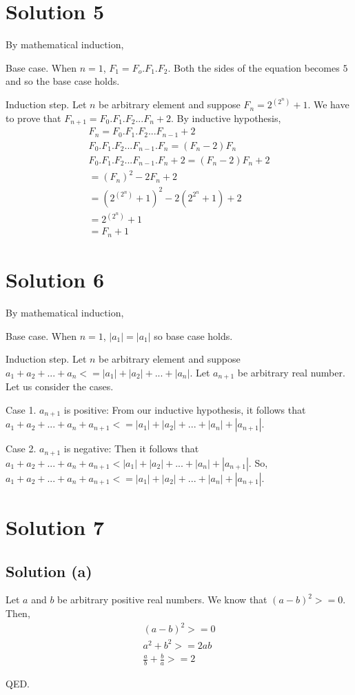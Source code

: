 \documentclass{article}
\begin{document}
\section{Solution 5}
By mathematical induction,

Base case. When $n=1$, $F_1 = F_o.F_1.F_2$. Both the sides of the
equation becomes $5$ and so the base case holds.

Induction step. Let $n$ be arbitrary element and suppose $F_n =
2^{(2^n)} + 1$. We have to prove that $F_{n+1} = F_0.F_1.F_2 ... F_n +
2$. By inductive hypothesis,
\begin{align*}
  F_n = F_0.F_1.F_2 ... F_{n-1} + 2 \\
  F_0.F_1.F_2 ... F_{n-1}.F_n = (F_n - 2)F_n \\
  F_0.F_1.F_2 ... F_{n-1}.F_n + 2 = (F_n - 2)F_n + 2 \\
  = (F_n)^2 - 2F_n + 2 \\
  = (2^{(2^n)} + 1)^2 - 2(2^{2^n} + 1) + 2 \\
  = 2^{(2^n)} + 1 \\
  = F_n + 1
\end{align*}

\section{Solution 6}
By mathematical induction,

Base case. When $n=1$, $|a_1| = |a_1|$ so base case holds.

Induction step. Let $n$ be arbitrary element and suppose $a_1 + a_2 +
... + a_n <= |a_1| + |a_2| + ... + |a_n|$. Let $a_{n+1}$ be arbitrary
real number. Let us consider the cases.

Case 1. $a_{n+1}$ is positive: From our inductive hypothesis, it
follows that $a_1 + a_2 + ... + a_n + a_{n+1} <= |a_1| + |a_2| + ... +
|a_n| + |a_{n+1}|$.

Case 2. $a_{n+1}$ is negative: Then it follows that
$a_1 + a_2 + ... + a_n + a_{n+1} < |a_1| + |a_2| + ... + |a_n| +
|a_{n+1}|$. So,
$a_1 + a_2 + ... + a_n + a_{n+1} <= |a_1| + |a_2| + ... + |a_n| +
|a_{n+1}|$.

\section{Solution 7}
\subsection{Solution (a)}
Let $a$ and $b$ be arbitrary positive real numbers. We know that
$(a-b)^2 >= 0$. Then,
\begin{align*}
  (a-b)^2 >= 0 \\
  a^2 + b^2 >= 2ab \\
  \frac{a}{b} + \frac{b}{a} >= 2
\end{align*}

QED.
\end{document}
